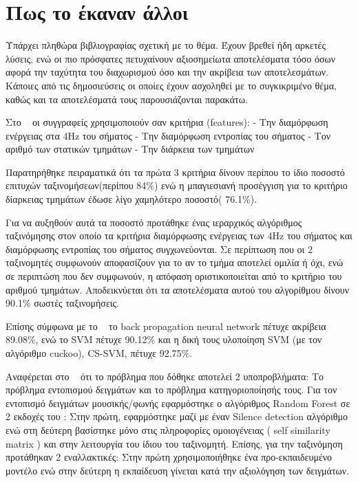 \section{Πως το έκαναν άλλοι}


Υπάρχει πληθώρα βιβλιογραφίας σχετική με το θέμα. Έχουν βρεθεί ήδη
αρκετές λύσεις, ενώ οι πιο πρόσφατες πετυχαίνουν αξιοσημείωτα
αποτελέσματα τόσο όσων αφορά την ταχύτητα του διαχωρισμού όσο και την
ακρίβεια των αποτελεσμάτων. Κάποιες από τις δημοσιεύσεις οι οποίες έχουν ασχοληθεί με το συγκικριμένο 
θέμα, καθώς και τα αποτελέσματά τους παρουσιάζονται παρακάτω.


Στο ~\cite{robust} οι συγγραφείς χρησιμοποιούν σαν κριτήρια (features):
- Την διαμόρφωση ενέργειας στα 4Hz του σήματος
- Την διαμόρφωση εντροπίας του σήματος
- Τον αριθμό των στατικών τμημάτων
- Την διάρκεια των τμημάτων 

Παρατηρήθηκε πειραματικά ότι τα πρώτα 3 κριτήρια δίνουν περίπου το ίδιο ποσοστό επιτυχών ταξινομήσεων(περίπου 84\%) ενώ η μπαγιεσιανή προσέγγιση για το κριτήριο δίαρκειας τμημάτων έδωσε λίγο χαμηλότερο ποσοστό( 76.1\%). 

Για να αυξηθούν αυτά τα ποσοστό προτάθηκε ένας ιεραρχικός αλγόριθμος ταξινόμησης στον οποίο τα κριτήρια διαμόρφωσης ενέργειας των 4Ηz του σήματος και διαμόρφωσης εντροπίας του σήματος συγχωνεύονται. Σε περίπτωση που οι 2 ταξινομητές συμφωνούν αποφασίζουν για το αν το τμήμα αποτελεί ομιλία ή όχι, ενώ σε περιπτώση που δεν συμφωνούν, η απόφαση οριστικοποιείται από το κριτήριο του αριθμού τμημάτων. Αποδεικνύεται ότι τα αποτελέσματα αυτού του αλγορίθμου δίνουν 90.1\% σωστές ταξινομήσεις.

Επίσης σύμφωνα με το ~\cite{cuckoo} το back propagation neural network πέτυχε
ακρίβεια 89.08\%, ενώ το SVM πέτυχε 90.12\% και η δική τους υλοποίηση
SVM (με τον αλγόριθμο cuckoo), CS-SVM, πέτυχε 92.75\%.


Αναφέρεται στο  ~\cite{mirex} ότι το πρόβλημα που δόθηκε αποτελεί 2 υποπροβλήματα: Το πρόβλημα εντοπισμού δειγμάτων και το πρόβλημα κατηγοριοποίησής τους.
Για τον εντοπισμό δειγμάτων μουσικής/φωνής εφαρμόστηκε ο αλγόριθμος Random Forest σε 2 εκδοχές του : Στην πρώτη, εφαρμόστηκε μαζί με έναν Silence detection αλγόριθμο ενώ στη δεύτερη βασίστηκε μόνο στις πληροφορίες ομοιογένειας ( self similarity matrix ) και στην λειτουργία του ίδιου του ταξινομητή. Επίσης, για την ταξινόμηση προτάθηκαν 2 εναλλακτικές: Στην πρώτη χρησιμοποιήθηκε ένα προ-εκπαιδευμένο μοντέλο ενώ στην δεύτερη η εκπαίδευση γίνεται κατά την αξιολόγηση των δειγμάτων.

